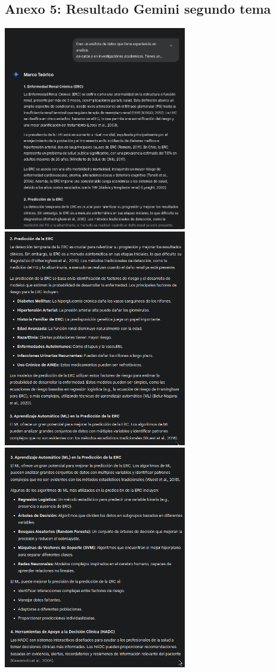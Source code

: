 \documentclass{article}
\begin{document}
\subsection{Anexo 5: Resultado Gemini segundo tema}
\begin{center}
    \includegraphics[width=0.6\textwidth]{../gemini_marco.png}\\
    \includegraphics[width=0.6\textwidth]{../gemini_marco_2.png}\\
    \includegraphics[width=0.6\textwidth]{../gemini3.png}\\

\end{center}
\end{document}
